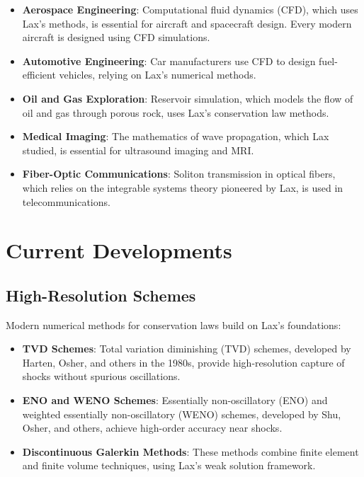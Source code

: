 \begin{itemize}
\item \textbf{Aerospace Engineering}: Computational fluid dynamics (CFD), which uses Lax's methods, is essential for aircraft and spacecraft design. Every modern aircraft is designed using CFD simulations.

\item \textbf{Automotive Engineering}: Car manufacturers use CFD to design fuel-efficient vehicles, relying on Lax's numerical methods.

\item \textbf{Oil and Gas Exploration}: Reservoir simulation, which models the flow of oil and gas through porous rock, uses Lax's conservation law methods.

\item \textbf{Medical Imaging}: The mathematics of wave propagation, which Lax studied, is essential for ultrasound imaging and MRI.

\item \textbf{Fiber-Optic Communications}: Soliton transmission in optical fibers, which relies on the integrable systems theory pioneered by Lax, is used in telecommunications.
\end{itemize}

\section{Current Developments}

\subsection{High-Resolution Schemes}

Modern numerical methods for conservation laws build on Lax's foundations:

\begin{itemize}
\item \textbf{TVD Schemes}: Total variation diminishing (TVD) schemes, developed by Harten, Osher, and others in the 1980s, provide high-resolution capture of shocks without spurious oscillations.

\item \textbf{ENO and WENO Schemes}: Essentially non-oscillatory (ENO) and weighted essentially non-oscillatory (WENO) schemes, developed by Shu, Osher, and others, achieve high-order accuracy near shocks.

\item \textbf{Discontinuous Galerkin Methods}: These methods combine finite element and finite volume techniques, using Lax's weak solution framework.
\end{itemize}

